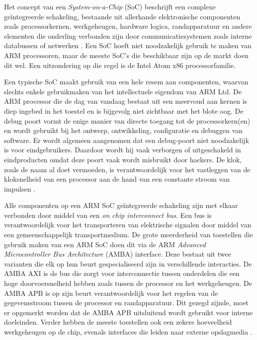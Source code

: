 Het concept van een \textit{System-on-a-Chip} (SoC) beschrijft een complexe geïntegreerde schakeling, bestaande uit allerhande elektronische componenten zoals processorkernen, werkgeheugen, hardware logica, randapparatuur en andere elementen die onderling verbonden zijn door communicatiesystemen zoals interne databussen of netwerken \autocite{MathWorks2022}. Een SoC hoeft niet noodzakelijk gebruik te maken van ARM processoren, maar de meeste SoC’s die beschikbaar zijn op de markt doen dit wel. Een uitzondering op die regel is de Intel Atom x86 processorfamilie.

Een typische SoC maakt gebruik van een hele resem aan componenten, waarvan slechts enkele gebruikmaken van het intellectuele eigendom van ARM Ltd. De ARM processor die de dag van vandaag bestaat uit een meervoud aan kernen is diep ingebed in het toestel en is bijgevolg niet zichtbaar met het blote oog. De debug poort vormt de enige manier van directe toegang tot de processorkern(en) en wordt gebruikt bij het ontwerp, ontwikkeling, configuratie en debuggen van software. Er wordt algemeen aangenomen dat een debug-poort niet noodzakelijk is voor eindgebruikers. Daardoor wordt hij vaak verborgen of uitgeschakeld in eindproducten omdat deze poort vaak wordt misbruikt door hackers. De klok, zoals de naam al doet vermoeden, is verantwoordelijk voor het vastleggen van de kloksnelheid van een processor aan de hand van een constante stroom van impulsen \autocite{Shaw2013}. 

Alle componenten op een ARM SoC geïntegreerde schakeling zijn met elkaar verbonden door middel van een \textit{on chip interconnect bus}. Een bus is verantwoordelijk voor het transporteren van elektrische signalen door middel van een gemeenschappelijk transportmedium. De grote meerderheid van toestellen die gebruik maken van een ARM SoC doen dit via de ARM \textit{Advanced Microcontroller Bus Architecture} (AMBA) interface. Deze bestaat uit twee varianten die elk op hun beurt gespecialiseerd zijn in verschillende interacties. De AMBA AXI is de bus die zorgt voor interconnectie tussen onderdelen die een hoge doorvoersnelheid hebben zoals tussen de processor en het werkgeheugen. De AMBA APB is op zijn beurt verantwoordelijk voor het regelen van de gegevensstroom tussen de processor en randapparatuur. Dit gezegd zijnde, moet er opgemerkt worden dat de AMBA APB uitsluitend wordt gebruikt voor interne doeleinden. Verder hebben de meeste toestellen ook een zekere hoeveelheid werkgeheugen op de chip, evenals interfaces die leiden naar externe opslagmedia \autocite{Shaw2013}.

